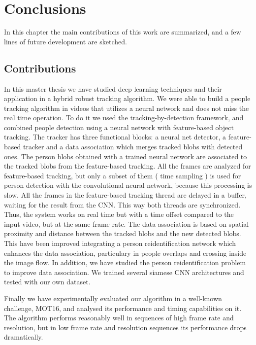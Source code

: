 \chapter{Conclusions}\label{cap.conclusions}


In this chapter the main contributions of this work are summarized, and a few lines of future development are sketched.

\section{Contributions}



In this master thesis we have studied deep learning techniques and their application in a hybrid robust tracking algorithm. We were able to build a people tracking algorithm in videos that utilizes a neural network and does not miss the real time operation. To do it we used the tracking-by-detection framework, and combined people detection using a neural network with feature-based object tracking. The tracker has three functional blocks: a neural net detector, a feature-based tracker and a data association which merges tracked blobs with detected ones. The person blobs obtained with a trained neural network are associated to the tracked blobs from the feature-based tracking. All the frames are analyzed for feature-based tracking, but only a subset of them ( time sampling ) is used for person detection with the convolutional neural network, because this processing is slow. All the frames in the feature-based tracking thread are delayed in a buffer, waiting for the result from the CNN. This way both threads are synchronized. Thus, the system works on real time but with a time offset compared to the input video, but at the same frame rate. The data association is based on spatial proximity and distance between the tracked blobs and the new detected blobs. This have been improved integrating a person reidentification network which enhances the data association, particulary in people overlaps and crossing inside the image flow. In addition, we have studied the person reidentification problem to improve data association. We trained several siamese CNN architectures and tested with our own dataset.

Finally we have experimentally evaluated our algorithm in a well-known challenge, MOT16, and analysed its performance and timing capabilities on it. The algorithm performs reasonably well in sequences of high frame rate and resolution, but in low frame rate and resolution sequences its performance drops dramatically. 


